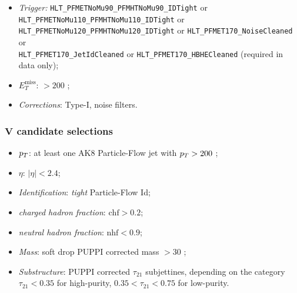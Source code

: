\begin{itemize}
    \item \textit{Trigger:}  {\tt HLT\_PFMETNoMu90\_PFMHTNoMu90\_IDTight} or {\tt HLT\_PFMETNoMu110\_PFMHTNoMu110\_IDTight} or {\tt HLT\_PFMETNoMu120\_PFMHTNoMu120\_IDTight} or {\tt HLT\_PFMET170\_NoiseCleaned} or \\ {\tt HLT\_PFMET170\_JetIdCleaned} or {\tt HLT\_PFMET170\_HBHECleaned} (required in data only);
    \item \textit{${E_T^{\text{miss}}}$}: $>200$ \GeV;
    \item \textit{Corrections}: Type-I, noise filters. 
\end{itemize}

\subsubsection{$\mathbf{V}$ candidate selections}

\begin{itemize}
    \item \textit{$p_T$}: at least one AK8 Particle-Flow jet with $p_T>200$ \GeV;
    \item \textit{$\eta$}: $|\eta|<2.4$;
    \item \textit{Identification}: \emph{tight} Particle-Flow Id;
    \item \textit{charged hadron fraction}: $\text{chf}>0.2$;
    \item \textit{neutral hadron fraction}: $\text{nhf}<0.9$;
    \item \textit{Mass}: soft drop PUPPI corrected mass $>30$ \GeV;%
    \item \textit{Substructure}: PUPPI corrected $\tau_{21}$ subjettines, depending on the category {\bf $\tau_{21} < 0.35$} for high-purity, {\bf $ 0.35 < \tau_{21} < 0.75$} for low-purity.
\end{itemize}


